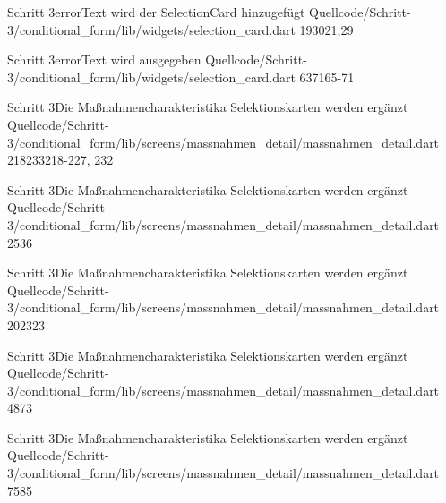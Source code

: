\begin{alexlisting}{Schritt 3}{errorText wird der SelectionCard hinzugefügt}
    {Quellcode/Schritt-3/conditional_form/lib/widgets/selection_card.dart}
    {19}{30}{21,29}
    \label{lst:Schritt3DieMassnahmencharakteristikaSelektionskartenWerdenergaenzt}
\end{alexlisting}

\begin{alexlisting}{Schritt 3}{errorText wird ausgegeben}
    {Quellcode/Schritt-3/conditional_form/lib/widgets/selection_card.dart}
    {63}{71}{65-71}
    \label{lst:Schritt3DieMassnahmencharakteristikaSelektionskartenWerdenergaenzt}
\end{alexlisting}

\begin{alexlisting}{Schritt 3}{Die Maßnahmencharakteristika Selektionskarten werden ergänzt}
    {Quellcode/Schritt-3/conditional_form/lib/screens/massnahmen_detail/massnahmen_detail.dart}
    {218}{233}{218-227, 232}
    \label{lst:Schritt3DieMassnahmencharakteristikaSelektionskartenWerdenergaenzt}
\end{alexlisting}

\begin{alexlisting}{Schritt 3}{Die Maßnahmencharakteristika Selektionskarten werden ergänzt}
    {Quellcode/Schritt-3/conditional_form/lib/screens/massnahmen_detail/massnahmen_detail.dart}
    {25}{36}{}
    \label{lst:Schritt3DieMassnahmencharakteristikaSelektionskartenWerdenergaenzt}
\end{alexlisting}

\begin{alexlisting}{Schritt 3}{Die Maßnahmencharakteristika Selektionskarten werden ergänzt}
    {Quellcode/Schritt-3/conditional_form/lib/screens/massnahmen_detail/massnahmen_detail.dart}
    {20}{23}{23}
    \label{lst:Schritt3DieMassnahmencharakteristikaSelektionskartenWerdenergaenzt}
\end{alexlisting}


\begin{alexlisting}{Schritt 3}{Die Maßnahmencharakteristika Selektionskarten werden ergänzt}
    {Quellcode/Schritt-3/conditional_form/lib/screens/massnahmen_detail/massnahmen_detail.dart}
    {48}{73}{}
    \label{lst:Schritt3DieMassnahmencharakteristikaSelektionskartenWerdenergaenzt}
\end{alexlisting}


\begin{alexlisting}{Schritt 3}{Die Maßnahmencharakteristika Selektionskarten werden ergänzt}
    {Quellcode/Schritt-3/conditional_form/lib/screens/massnahmen_detail/massnahmen_detail.dart}
    {75}{85}{}
    \label{lst:Schritt3DieMassnahmencharakteristikaSelektionskartenWerdenergaenzt}
\end{alexlisting}

